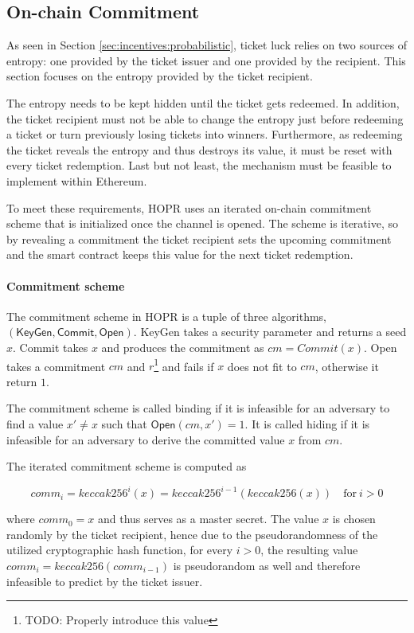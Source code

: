 \subsection{On-chain Commitment}
\label{sec:incentives:commitment}

As seen in Section \ref{sec:incentives:probabilistic}, ticket luck relies on two sources of entropy: one provided by the ticket issuer and one provided by the recipient. This section focuses on the entropy provided by the ticket recipient.

The entropy needs to be kept hidden until the ticket gets redeemed. In addition, the ticket recipient must not be able to change the entropy just before redeeming a ticket or turn previously losing tickets into winners. Furthermore, as redeeming the ticket reveals the entropy and thus destroys its value, it must be reset with every ticket redemption. Last but not least, the mechanism must be feasible to implement within Ethereum.

To meet these requirements, HOPR uses an iterated on-chain commitment scheme that is initialized once the channel is opened. The scheme is iterative, so by revealing a commitment the ticket recipient sets the upcoming commitment and the smart contract keeps this value for the next ticket redemption.

\paragraph{Commitment scheme}
\label{sec:incentives:commitment:scheme}

The commitment scheme in HOPR is a tuple of three algorithms, $(\mathsf{KeyGen}, \mathsf{Commit}, \mathsf{Open})$. \textsf{KeyGen} takes a security parameter and returns a seed $x$. \textsf{Commit} takes $x$ and produces the commitment as $ cm = Commit(x) $. \textsf{Open} takes a commitment $cm$ and $r$\footnote{TODO: Properly introduce this value} and fails if $x$ does not fit to $cm$, otherwise it return $1$.

The commitment scheme is called binding if it is infeasible for an adversary to find a value $x' \ne x$ such that $\mathsf{Open}(cm, x') = 1$. It is called hiding if it is infeasible for an adversary to derive the committed value $x$ from $cm$.

The iterated commitment scheme is computed as

$$ comm_i = keccak256 ^i (x) = keccak256 ^{i-1} (keccak256 (x)) \quad \text{for} \ i > 0$$

where $comm_0 = x$ and thus serves as a master secret. The value $x$ is chosen randomly by the ticket recipient, hence due to the pseudorandomness of the utilized cryptographic hash function, for every $i > 0$, the resulting value $comm_i = keccak256(comm_{i-1})$ is pseudorandom as well and therefore infeasible to predict by the ticket issuer.

